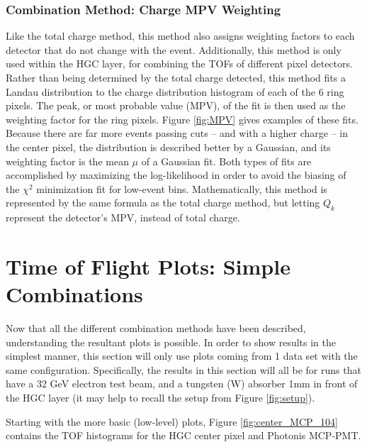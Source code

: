 \documentclass[twocolumn,aps,prd,reprint,superscriptaddress,floatfix]{revtex4-1}
\begin{document}
\subsubsection{Combination Method: Charge MPV Weighting}
Like the total charge method, this method also assigns weighting factors to each detector that do not change with the event. 
Additionally, this method is only used within the HGC layer, for combining the TOFs of different pixel detectors. 
Rather than being determined by the total charge detected, this method fits a Landau distribution to the charge distribution histogram of each of the 6 ring pixels.
The peak, or most probable value (MPV), of the fit is then used as the weighting factor for the ring pixels. 
Figure \ref{fig:MPV} gives examples of these fits.
Because there are far more events passing cuts -- and with a higher charge -- in the center pixel, the distribution is described better by a Gaussian, and its weighting factor is the mean $\mu$ of a Gaussian fit.
Both types of fits are accomplished by maximizing the log-likelihood in order to avoid the biasing of the $\chi^2$ minimization fit for low-event bins.
Mathematically, this method is represented by the same formula as the total charge method, but letting $Q_k$ represent the detector's MPV, instead of total charge.


\section{Time of Flight Plots: Simple Combinations}
Now that all the different combination methods have been described, understanding the resultant plots is possible. 
In order to show results in the simplest manner, this section will only use plots coming from 1 data set with the same configuration. 
Specifically, the results in this section will all be for runs that have a 32 GeV electron test beam, and a tungsten (W) absorber 1mm in front of the HGC layer (it may help to recall the setup from Figure \ref{fig:setup}).

Starting with the more basic (low-level) plots, Figure \ref{fig:center_MCP_104} contains the TOF histograms for the HGC center pixel and Photonis MCP-PMT.
\end{document}

